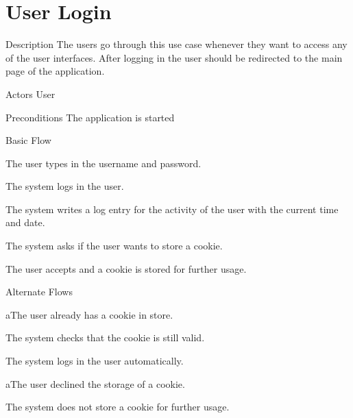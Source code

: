 \section{User Login}

\begin{cpart}{Description}
The users go through this use case whenever they want to access any of the user interfaces. After logging in the user should be redirected to the main page of the application.
\end{cpart}

\begin{cpart}{Actors}
User
\end{cpart}

\begin{cpart}{Preconditions}
The application is started
\end{cpart}

\begin{cpartList}{Basic Flow}
  \item The user types in the username and password.
  \item The system logs in the user.
  \item The system writes a log entry for the activity of the user with the current time and date.
  \item The system asks if the user wants to store a cookie.
  \item The user accepts and a cookie is stored for further usage.
\end{cpartList}

\begin{cpartList}{Alternate Flows}
  \begin{innerList}{1}{a}{The user already has a cookie in store.}
    \item The system checks that the cookie is still valid.
    \item The system logs in the user automatically.
  \end{innerList}
  \begin{innerList}{3}{a}{The user declined the storage of a cookie.}
    \item The system does not store a cookie for further usage.
  \end{innerList}
\end{cpartList}

